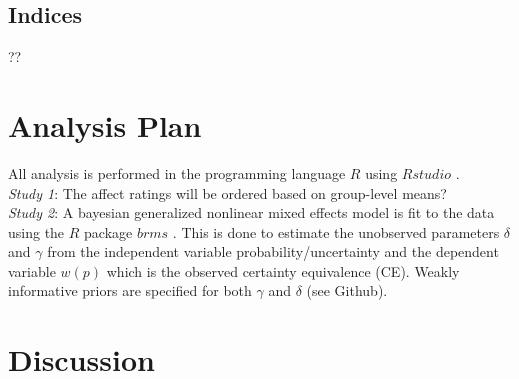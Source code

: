\documentclass[12pt]{article}
\begin{document}
\subsection{Indices}

??

\section{Analysis Plan}

All analysis is performed in the programming
language $R$ \autocite{rcore} using $Rstudio$
\autocite{rstudio}. \\

\emph{Study 1}: The affect ratings will be
ordered based on group-level means? \\

\emph{Study 2}: A bayesian generalized nonlinear
mixed effects model is fit to the data using the
$R$ package $brms$ \autocite{brms}.
This is done to estimate the unobserved parameters
$\delta$ and $\gamma$ from the independent variable
probability/uncertainty and the dependent variable
$w(p)$ which is the observed certainty equivalence (CE).
Weakly informative priors are specified for both
$\gamma$ and $\delta$ (see Github).


\section{Discussion}

\printbibliography
\end{document}
